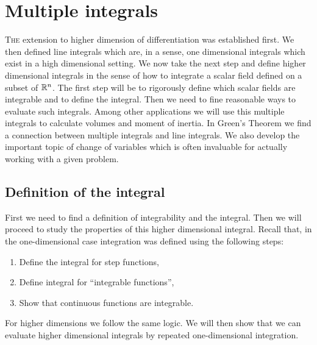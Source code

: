 \chapter{Multiple integrals}

\lettrine{T}{he} extension to higher dimension of differentiation was established first.
We then defined line integrals which are, in a sense, one dimensional integrals which exist in a high dimensional setting.
We now take the next step and define higher dimensional integrals in the sense of how to integrate a scalar field defined on a subset of \(\mathbb{R}^n\).
The first step will be to rigorously define which scalar fields are integrable and to define the integral.
Then we need to fine reasonable ways to evaluate such integrals. 
Among other applications we will use this multiple integrals to calculate volumes and moment of inertia.
In Green's Theorem we find a connection between multiple integrals and line integrals.
We also develop the important topic of change of variables which is often invaluable for actually working with a given problem.

\section{Definition of the integral}

First we need to find a definition of integrability and the integral.
Then we will proceed to study the properties of this higher dimensional integral.
Recall that, in the one-dimensional case integration was defined using the following steps:
\begin{enumerate}
    \item Define the integral for step functions,
    \item Define integral for ``integrable functions'',
    \item Show that continuous functions are integrable.
\end{enumerate}
For higher dimensions we follow the same logic.
We will then show that we can evaluate higher dimensional integrals by repeated one-dimensional integration.

